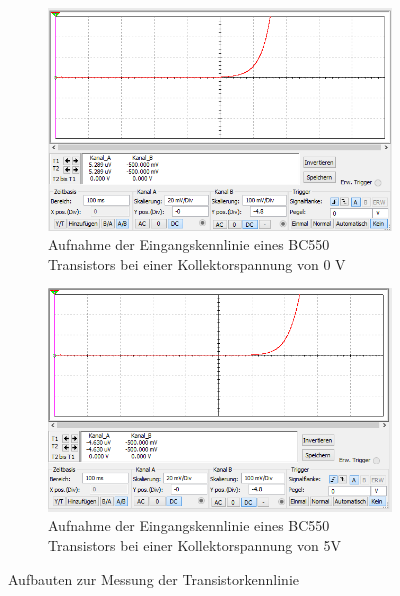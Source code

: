 \documentclass[12pt,a4paper]{article}
\begin{document}
\begin{figure}[H]
        \centering
        \begin{subfigure}[t]{0.48\textwidth}
               \includegraphics[trim = 0mm 0mm 0mm 0mm, clip, scale = 0.5]{3_3_eingangskennlinie_0Volt.PNG}
				\caption[Aufnahme der Eingangskennlinie eines BC550 Transistors bei einer Kollektorspannung von 0 V]{Aufnahme der Eingangskennlinie eines BC550 Transistors bei einer Kollektorspannung von 0 V}
 				 \label{fig:3.311}
        \end{subfigure}%
        \hfill
        \begin{subfigure}[t]{0.48\textwidth}
                \includegraphics[trim = 0mm 0mm 0mm 0mm, clip, scale = 0.5]{3_3_eingangskennlinie_5Volt.PNG}
  				\caption[Aufnahme der Eingangskennlinie eines BC550 Transistors bei einer Kollektorspannung von 5 V]{Aufnahme der Eingangskennlinie eines BC550 Transistors bei einer Kollektorspannung von 5V}
  				\label{fig:3.312}
        \end{subfigure}
        \caption{Aufbauten zur Messung der Transistorkennlinie}
        \label{fig:3.31_Auswertung}
\end{figure}
\end{document}
